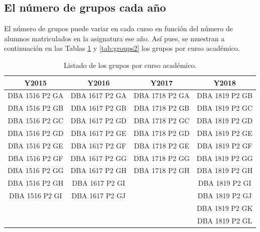\subsection{El número de grupos cada año}
El número de grupos puede variar en cada curso en función del número de alumnos matriculados en la asignatura ese año. Así pues, se muestran a continuación en las Tablas \ref{tab:groups1} y \ref{tab:groups2} los grupos por curso académico.

\begin{table}[H]
\centering
\caption{Listado de los grupos por curso académico.}
\label{tab:groups1}
\begin{tabular}{cccc}
\hline
\textbf{Y2015} & \textbf{Y2016} & \textbf{Y2017} & \textbf{Y2018} \\ \hline
DBA 1516 P2 GA & DBA 1617 P2 GA & DBA 1718 P2 GA & DBA 1819 P2 GB \\
DBA 1516 P2 GB & DBA 1617 P2 GB & DBA 1718 P2 GB & DBA 1819 P2 GC \\
DBA 1516 P2 GC & DBA 1617 P2 GD & DBA 1718 P2 GC & DBA 1819 P2 GD \\
DBA 1516 P2 GD & DBA 1617 P2 GE & DBA 1718 P2 GD & DBA 1819 P2 GE \\
DBA 1516 P2 GE & DBA 1617 P2 GF & DBA 1718 P2 GE & DBA 1819 P2 GF \\
DBA 1516 P2 GF & DBA 1617 P2 GG & DBA 1718 P2 GG & DBA 1819 P2 GG \\
DBA 1516 P2 GG & DBA 1617 P2 GH & DBA 1718 P2 GH & DBA 1819 P2 GH \\
DBA 1516 P2 GH & DBA 1617 P2 GI & 				 & DBA 1819 P2 GI \\
DBA 1516 P2 GI & DBA 1617 P2 GJ & 				 & DBA 1819 P2 GJ \\
			   &				&			     & DBA 1819 P2 GK \\
			   &				&				 & DBA 1819 P2 GL \\ \hline
\end{tabular}
\end{table}


